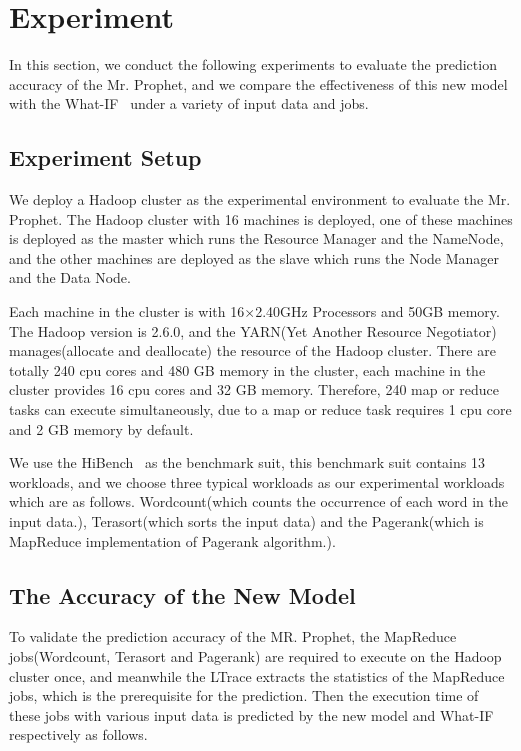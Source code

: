 \section{Experiment}
In this section, we conduct the following experiments to evaluate the prediction accuracy of the Mr. Prophet, and we compare the effectiveness of this new model with the What-IF~\cite{Herodotou2011Profiling} under a variety of input data and jobs.

\subsection{Experiment Setup}
We deploy a Hadoop cluster as the experimental environment to evaluate the Mr. Prophet. The Hadoop cluster with 16 machines is deployed, one of these machines is deployed as the master which runs the Resource Manager and the NameNode, and the other machines are deployed as the slave which runs the Node Manager and the Data Node.

Each machine in the cluster is with 16$\times$2.40GHz Processors and 50GB memory. The Hadoop version is 2.6.0, and the YARN(Yet Another Resource Negotiator)~\cite{Vavilapalli2013Apache} manages(allocate and deallocate) the resource of the Hadoop cluster. There are totally 240 cpu cores and 480 GB memory in the cluster, each machine in the cluster provides 16 cpu cores and 32 GB memory. Therefore, 240 map or reduce tasks can execute simultaneously, due to a map or reduce task requires 1 cpu core and 2 GB memory by default.

We use the HiBench~\cite{Huang2010The} as the benchmark suit, this benchmark suit contains 13 workloads, and we choose three typical workloads as our experimental workloads which are as follows. Wordcount(which counts the occurrence of each word in the input data.), Terasort(which sorts the input data) and the Pagerank(which is MapReduce implementation of Pagerank algorithm.).

\subsection{The Accuracy of the New Model}
To validate the prediction accuracy of the MR. Prophet, the MapReduce jobs(Wordcount, Terasort and Pagerank) are required to execute on the Hadoop cluster once, and meanwhile the LTrace extracts the statistics of the MapReduce jobs, which is the prerequisite for the prediction. Then the execution time of these jobs with various input data is predicted by the new model and What-IF respectively as follows.

